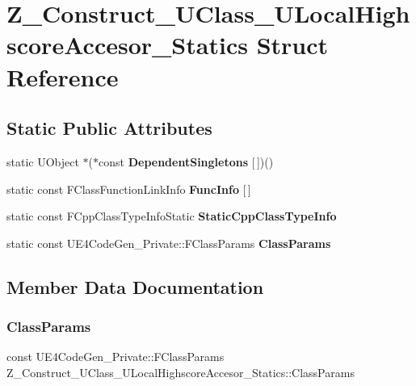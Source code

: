 \hypertarget{struct_z___construct___u_class___u_local_highscore_accesor___statics}{}\section{Z\+\_\+\+Construct\+\_\+\+U\+Class\+\_\+\+U\+Local\+Highscore\+Accesor\+\_\+\+Statics Struct Reference}
\label{struct_z___construct___u_class___u_local_highscore_accesor___statics}
\subsection*{Static Public Attributes}
\begin{DoxyCompactItemize}
\item 
\mbox{\label{struct_z___construct___u_class___u_local_highscore_accesor___statics_ab42a9bebf535e73190e2f942c382762e}} 
static U\+Object $\ast$($\ast$const {\bfseries Dependent\+Singletons} \mbox{[}$\,$\mbox{]})()
\item 
static const F\+Class\+Function\+Link\+Info {\bfseries Func\+Info} \mbox{[}$\,$\mbox{]}
\item 
static const F\+Cpp\+Class\+Type\+Info\+Static {\bfseries Static\+Cpp\+Class\+Type\+Info}
\item 
static const U\+E4\+Code\+Gen\+\_\+\+Private\+::\+F\+Class\+Params {\bfseries Class\+Params}
\end{DoxyCompactItemize}


\subsection{Member Data Documentation}
\mbox{\label{struct_z___construct___u_class___u_local_highscore_accesor___statics_ab83ac8dbed01601918ebf5399cd899ce}} 
\subsubsection{\texorpdfstring{ClassParams}{ClassParams}}
{\footnotesize\ttfamily const U\+E4\+Code\+Gen\+\_\+\+Private\+::\+F\+Class\+Params Z\+\_\+\+Construct\+\_\+\+U\+Class\+\_\+\+U\+Local\+Highscore\+Accesor\+\_\+\+Statics\+::\+Class\+Params\hspace{0.3cm}{\ttfamily [static]}}

